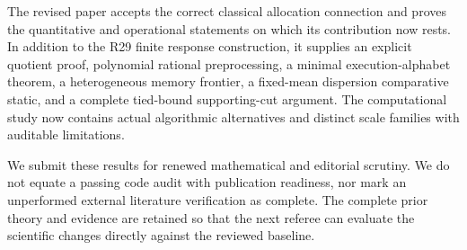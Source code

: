 \documentclass[
  11pt,
]{article}
\begin{document}
The revised paper accepts the correct classical allocation connection
and proves the quantitative and operational statements on which its
contribution now rests. In addition to the R29 finite response
construction, it supplies an explicit quotient proof, polynomial
rational preprocessing, a minimal execution-alphabet theorem, a
heterogeneous memory frontier, a fixed-mean dispersion comparative
static, and a complete tied-bound supporting-cut argument. The
computational study now contains actual algorithmic alternatives and
distinct scale families with auditable limitations.

We submit these results for renewed mathematical and editorial scrutiny.
We do not equate a passing code audit with publication readiness, nor
mark an unperformed external literature verification as complete. The
complete prior theory and evidence are retained so that the next referee
can evaluate the scientific changes directly against the reviewed
baseline.
\end{document}
